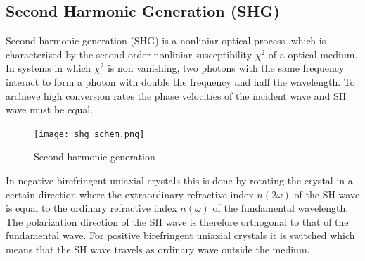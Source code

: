 \subsection{Second Harmonic Generation (SHG)}
    Second-harmonic generation (SHG) is a nonliniar optical process ,which is characterized by the second-order nonliniar susceptibility $\chi^{2}$ of a optical medium.
    In systems in which $\chi^{2}$ is non vanishing, two photons with the same frequency interact to form a photon with double the frequency and half the wavelength.
    To archieve high conversion rates the phase velocities of the incident wave and SH wave must be equal. \cite{demtroder2014laser}
    \begin{figure}
        \centering
        \vspace{-\normalbaselineskip}
        \texttt{[image: shg\_schem.png]}
        \vspace{-10pt}
        \caption{Second harmonic generation \cite{shg}  }
        
        \label{fig:shg:basic}
    \end{figure}
    In negative birefringent uniaxial crystals this is done by rotating the crystal in a certain direction where the extraordinary refractive index $n(2\omega)$ of the SH wave is equal to the ordinary refractive index $n(\omega)$ of the fundamental wavelength.
    The polarization direction of the SH wave is therefore orthogonal to that of the fundamental wave.
    For positive birefringent uniaxial crystals it is switched which means that the SH wave travels as ordinary wave outside the medium.

